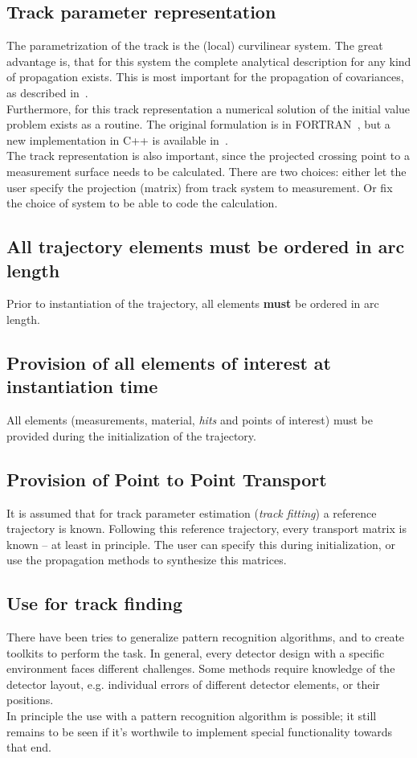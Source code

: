 \documentclass[12pt]{article}
\begin{document}
\subsection{Track parameter representation}
The parametrization of the track is the (local) curvilinear system.
The great advantage is, that for this system the complete analytical description for any kind of propagation exists.
This is most important for the propagation of covariances, as described in~\cite{strandlie}.\\
Furthermore, for this track representation a numerical solution of the initial value problem exists as a routine.
The original formulation is in FORTRAN~\cite{geane}, but a new implementation in C++ is available in~\cite{genfit}.\\
The track representation is also important, since the projected crossing point to a measurement surface needs to be calculated.
There are two choices: either let the user specify the projection (matrix) from track system to measurement.
Or fix the choice of system to be able to code the calculation.

\subsection{All trajectory elements must be ordered in arc length}
Prior to instantiation of the trajectory, all elements {\bf must} be ordered in arc length.

\subsection{Provision of all elements of interest at instantiation time}
All elements (measurements, material, {\em hits} and points of interest) must be provided during the initialization of the trajectory.

\subsection{Provision of Point to Point Transport}
It is assumed that for track parameter estimation ({\em track fitting}) a reference trajectory is known.
Following this reference trajectory, every transport matrix is known -- at least in principle.
The user can specify this during initialization, or use the propagation methods to synthesize this matrices.

\subsection{Use for track finding}
There have been tries to generalize pattern recognition algorithms, and to create toolkits to perform the task.
In general, every detector design with a specific environment faces different challenges.
Some methods require knowledge of the detector layout, e.g. individual errors of different detector elements, or their positions.
\\
In principle the use with a pattern recognition algorithm is possible; it still remains to be seen if it's worthwile to implement special functionality towards that end.
\end{document}
